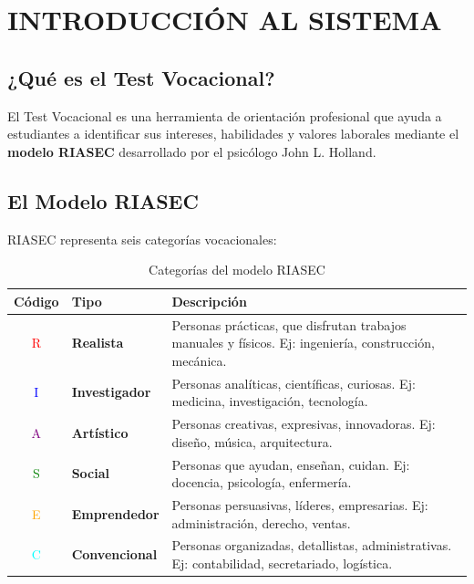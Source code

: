 \documentclass[12pt, a4paper]{report}
\begin{document}
\tableofcontents
\newpage

\listoffigures
\newpage

\chapter{INTRODUCCIÓN AL SISTEMA}

\section{¿Qué es el Test Vocacional?}
El Test Vocacional es una herramienta de orientación profesional que ayuda a estudiantes a identificar sus intereses, habilidades y valores laborales mediante el \textbf{modelo RIASEC} desarrollado por el psicólogo John L. Holland.

\section{El Modelo RIASEC}
RIASEC representa seis categorías vocacionales:

\begin{table}[htbp]
\centering
\begin{tabularx}{\textwidth}{|c|X|l|}
\hline
\textbf{Código} & \textbf{Tipo} & \textbf{Descripción} \\
\hline
\textcolor{red}{R} & \textbf{Realista} & Personas prácticas, que disfrutan trabajos manuales y físicos. Ej: ingeniería, construcción, mecánica. \\
\hline
\textcolor{blue}{I} & \textbf{Investigador} & Personas analíticas, científicas, curiosas. Ej: medicina, investigación, tecnología. \\
\hline
\textcolor{purple}{A} & \textbf{Artístico} & Personas creativas, expresivas, innovadoras. Ej: diseño, música, arquitectura. \\
\hline
\textcolor{green}{S} & \textbf{Social} & Personas que ayudan, enseñan, cuidan. Ej: docencia, psicología, enfermería. \\
\hline
\textcolor{orange}{E} & \textbf{Emprendedor} & Personas persuasivas, líderes, empresarias. Ej: administración, derecho, ventas. \\
\hline
\textcolor{cyan}{C} & \textbf{Convencional} & Personas organizadas, detallistas, administrativas. Ej: contabilidad, secretariado, logística. \\
\hline
\end{tabularx}
\caption{Categorías del modelo RIASEC}
\end{table}
\end{document}

